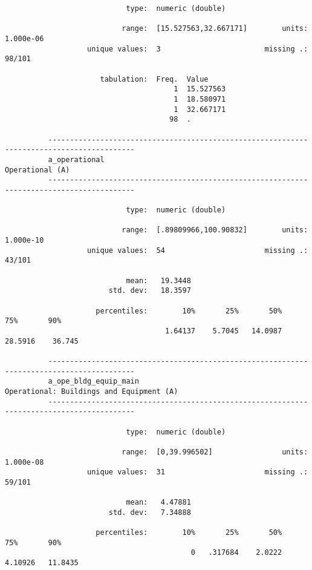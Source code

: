 \documentclass{article}
\begin{document}
\begin{verbatim}
                            type:  numeric (double)
          
                           range:  [15.527563,32.667171]        units:  1.000e-06
                   unique values:  3                        missing .:  98/101
          
                      tabulation:  Freq.  Value
                                       1  15.527563
                                       1  18.580971
                                       1  32.667171
                                      98  .
          
          ------------------------------------------------------------------------------------------
          a_operational                                                              Operational (A)
          ------------------------------------------------------------------------------------------
          
                            type:  numeric (double)
          
                           range:  [.89809966,100.90832]        units:  1.000e-10
                   unique values:  54                       missing .:  43/101
          
                            mean:   19.3448
                        std. dev:   18.3597
          
                     percentiles:        10%       25%       50%       75%       90%
                                     1.64137    5.7045   14.0987   28.5916    36.745
          
          ------------------------------------------------------------------------------------------
          a_ope_bldg_equip_main                             Operational: Buildings and Equipment (A)
          ------------------------------------------------------------------------------------------
          
                            type:  numeric (double)
          
                           range:  [0,39.996502]                units:  1.000e-08
                   unique values:  31                       missing .:  59/101
          
                            mean:   4.47881
                        std. dev:   7.34888
          
                     percentiles:        10%       25%       50%       75%       90%
                                           0   .317684    2.0222   4.10926   11.8435
          

\end{verbatim}
\end{document}

